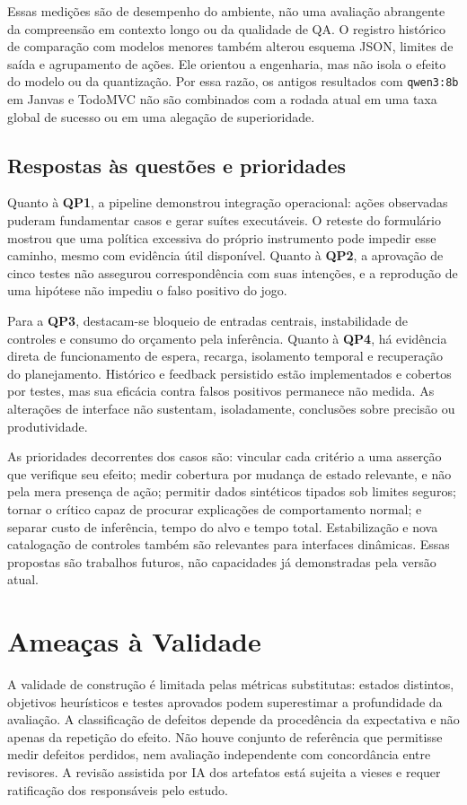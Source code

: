 \documentclass[12pt]{article}
\begin{document}
Essas medições são de desempenho do ambiente, não uma avaliação abrangente da compreensão em contexto longo ou da qualidade de QA. O registro histórico de comparação com modelos menores também alterou esquema JSON, limites de saída e agrupamento de ações. Ele orientou a engenharia, mas não isola o efeito do modelo ou da quantização. Por essa razão, os antigos resultados com \texttt{qwen3:8b} em Janvas e TodoMVC não são combinados com a rodada atual em uma taxa global de sucesso ou em uma alegação de superioridade.

\subsection{Respostas às questões e prioridades}
Quanto à \textbf{QP1}, a pipeline demonstrou integração operacional: ações observadas puderam fundamentar casos e gerar suítes executáveis. O reteste do formulário mostrou que uma política excessiva do próprio instrumento pode impedir esse caminho, mesmo com evidência útil disponível. Quanto à \textbf{QP2}, a aprovação de cinco testes não assegurou correspondência com suas intenções, e a reprodução de uma hipótese não impediu o falso positivo do jogo.

Para a \textbf{QP3}, destacam-se bloqueio de entradas centrais, instabilidade de controles e consumo do orçamento pela inferência. Quanto à \textbf{QP4}, há evidência direta de funcionamento de espera, recarga, isolamento temporal e recuperação do planejamento. Histórico e feedback persistido estão implementados e cobertos por testes, mas sua eficácia contra falsos positivos permanece não medida. As alterações de interface não sustentam, isoladamente, conclusões sobre precisão ou produtividade.

As prioridades decorrentes dos casos são: vincular cada critério a uma asserção que verifique seu efeito; medir cobertura por mudança de estado relevante, e não pela mera presença de ação; permitir dados sintéticos tipados sob limites seguros; tornar o crítico capaz de procurar explicações de comportamento normal; e separar custo de inferência, tempo do alvo e tempo total. Estabilização e nova catalogação de controles também são relevantes para interfaces dinâmicas. Essas propostas são trabalhos futuros, não capacidades já demonstradas pela versão atual.

\section{Ameaças à Validade}\label{sec:threats}
A validade de construção é limitada pelas métricas substitutas: estados distintos, objetivos heurísticos e testes aprovados podem superestimar a profundidade da avaliação. A classificação de defeitos depende da procedência da expectativa e não apenas da repetição do efeito. Não houve conjunto de referência que permitisse medir defeitos perdidos, nem avaliação independente com concordância entre revisores. A revisão assistida por IA dos artefatos está sujeita a vieses e requer ratificação dos responsáveis pelo estudo.
\end{document}

